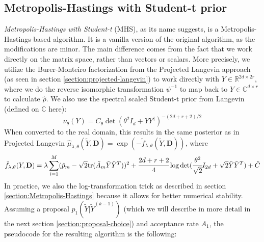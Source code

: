 \documentclass[12pt]{memoir}
\newcommand{\tr}{\text{tr}}
\newcommand{\mb}{\mathbf}
\begin{document}
\subsection*{Metropolis-Hastings with Student-t prior}
\textit{Metropolis-Hastings with Student-t} (MHS), as its name suggests, is a Metropolis-Hastings-based algorithm. It is a vanilla version of the original algorithm, as the modifications are minor. The main difference comes from the fact that we work directly on the matrix space, rather than vectors or scalars. More precisely, we utilize the Burer-Monteiro factorization from the Projected Langevin approach (as seen in section \ref{section:projected-langevin}) to work directly with $Y \in \mathbb{R}^{2d \times 2r}$, where we do the reverse isomorphic transformation $\psi^{-1}$ to map back to $Y \in \mathbb{C}^{d\times r}$ to calculate $\hat \rho$. We also use the spectral scaled Student-t prior from Langevin (defined on $\mathbb{C}$ here):
\begin{equation}
    \nu_{\theta} (Y) = C_\theta \det(\theta^2I_d + YY^\dagger)^{-(2d+r+2)/2}
\end{equation}
When converted to the real domain, this results in the same posterior as in Projected Langevin $\hat \mu_{\lambda, \theta}(\tilde Y, \mb D) =\exp(-\tilde f_{\lambda, \theta}(\tilde Y, \mb D))$, where 
\begin{equation}
    \tilde f_{\lambda, \theta}(Y, \mb D) = \lambda \sum^{M}_{i=1} (\hat p_m - \sqrt{2}\tr(\tilde A_m \tilde Y \tilde Y^{T}))^2 + \cfrac{2d + r + 2}{4}\log \det(\cfrac{\theta^2}{\sqrt 2}I_{2d} + \sqrt 2 \tilde Y \tilde Y^{T}) + \tilde C
\end{equation}
In practice, we also the log-transformation trick as described in section \ref{section:Metropolis-Hastings} because it allows for better numerical stability. Assuming a proposal $p_1(\tilde Y|\tilde Y^{(k-1)})$ (which we will describe in more detail in the next section \ref{section:proposal-choice}) and acceptance rate $A_1$, the pseudocode for the resulting algorithm is the following:\medbreak
\end{document}
